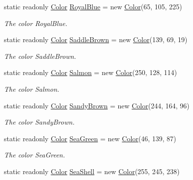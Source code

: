 \begin{DoxyCompactItemize}
static readonly \hyperlink{struct_tri_devs_1_1_tri_engine_1_1_color}{Color} \hyperlink{struct_tri_devs_1_1_tri_engine_1_1_color_ac98fc2cbcc98003e40959349b6a3c38f}{Royal\-Blue} = new \hyperlink{struct_tri_devs_1_1_tri_engine_1_1_color}{Color}(65, 105, 225)
\begin{DoxyCompactList}\small\item\em The color Royal\-Blue. \end{DoxyCompactList}\item 
static readonly \hyperlink{struct_tri_devs_1_1_tri_engine_1_1_color}{Color} \hyperlink{struct_tri_devs_1_1_tri_engine_1_1_color_abc7fe14501f5d94ee3b89dd2521077e7}{Saddle\-Brown} = new \hyperlink{struct_tri_devs_1_1_tri_engine_1_1_color}{Color}(139, 69, 19)
\begin{DoxyCompactList}\small\item\em The color Saddle\-Brown. \end{DoxyCompactList}\item 
static readonly \hyperlink{struct_tri_devs_1_1_tri_engine_1_1_color}{Color} \hyperlink{struct_tri_devs_1_1_tri_engine_1_1_color_a8030da2e0fdf0ec5139f69655544cb03}{Salmon} = new \hyperlink{struct_tri_devs_1_1_tri_engine_1_1_color}{Color}(250, 128, 114)
\begin{DoxyCompactList}\small\item\em The color Salmon. \end{DoxyCompactList}\item 
static readonly \hyperlink{struct_tri_devs_1_1_tri_engine_1_1_color}{Color} \hyperlink{struct_tri_devs_1_1_tri_engine_1_1_color_a2906f55d9a017b3f472a312d26852c3a}{Sandy\-Brown} = new \hyperlink{struct_tri_devs_1_1_tri_engine_1_1_color}{Color}(244, 164, 96)
\begin{DoxyCompactList}\small\item\em The color Sandy\-Brown. \end{DoxyCompactList}\item 
static readonly \hyperlink{struct_tri_devs_1_1_tri_engine_1_1_color}{Color} \hyperlink{struct_tri_devs_1_1_tri_engine_1_1_color_a522c4eb74ab80155a696752910e1c09c}{Sea\-Green} = new \hyperlink{struct_tri_devs_1_1_tri_engine_1_1_color}{Color}(46, 139, 87)
\begin{DoxyCompactList}\small\item\em The color Sea\-Green. \end{DoxyCompactList}\item 
static readonly \hyperlink{struct_tri_devs_1_1_tri_engine_1_1_color}{Color} \hyperlink{struct_tri_devs_1_1_tri_engine_1_1_color_a3e2379f5d86520839adb3f76f9181e79}{Sea\-Shell} = new \hyperlink{struct_tri_devs_1_1_tri_engine_1_1_color}{Color}(255, 245, 238)

\end{DoxyCompactItemize}
